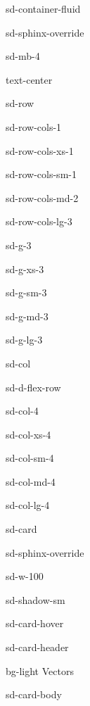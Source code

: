 \documentclass[letterpaper,10pt,english]{jupyterBook}
\let\sphinxpxdimen\pdfpxdimen\else\newdimen\sphinxpxdimen
\begin{document}
\begin{sphinxuseclass}{sd-container-fluid}
\begin{sphinxuseclass}{sd-sphinx-override}
\begin{sphinxuseclass}{sd-mb-4}
\begin{sphinxuseclass}{text-center}
\begin{sphinxuseclass}{sd-row}
\begin{sphinxuseclass}{sd-row-cols-1}
\begin{sphinxuseclass}{sd-row-cols-xs-1}
\begin{sphinxuseclass}{sd-row-cols-sm-1}
\begin{sphinxuseclass}{sd-row-cols-md-2}
\begin{sphinxuseclass}{sd-row-cols-lg-3}
\begin{sphinxuseclass}{sd-g-3}
\begin{sphinxuseclass}{sd-g-xs-3}
\begin{sphinxuseclass}{sd-g-sm-3}
\begin{sphinxuseclass}{sd-g-md-3}
\begin{sphinxuseclass}{sd-g-lg-3}
\begin{sphinxuseclass}{sd-col}
\begin{sphinxuseclass}{sd-d-flex-row}
\begin{sphinxuseclass}{sd-col-4}
\begin{sphinxuseclass}{sd-col-xs-4}
\begin{sphinxuseclass}{sd-col-sm-4}
\begin{sphinxuseclass}{sd-col-md-4}
\begin{sphinxuseclass}{sd-col-lg-4}
\begin{sphinxuseclass}{sd-card}
\begin{sphinxuseclass}{sd-sphinx-override}
\begin{sphinxuseclass}{sd-w-100}
\begin{sphinxuseclass}{sd-shadow-sm}
\begin{sphinxuseclass}{sd-card-hover}
\begin{sphinxuseclass}{sd-card-header}
\begin{sphinxuseclass}{bg-light}
\sphinxAtStartPar
Vectors

\end{sphinxuseclass}
\end{sphinxuseclass}
\begin{sphinxuseclass}{sd-card-body}
\begin{figure}[htbp]
\centering

\noindent\sphinxincludegraphics[width=250\sphinxpxdimen]{{3_dot_product}.png}
\end{figure}


\end{sphinxuseclass}
\end{sphinxuseclass}
\end{sphinxuseclass}
\end{sphinxuseclass}
\end{sphinxuseclass}
\end{sphinxuseclass}
\end{sphinxuseclass}
\end{sphinxuseclass}
\end{sphinxuseclass}
\end{sphinxuseclass}
\end{sphinxuseclass}
\end{sphinxuseclass}
\end{sphinxuseclass}
\end{sphinxuseclass}
\end{sphinxuseclass}
\end{sphinxuseclass}
\end{sphinxuseclass}
\end{sphinxuseclass}
\end{sphinxuseclass}
\end{sphinxuseclass}
\end{sphinxuseclass}
\end{sphinxuseclass}
\end{sphinxuseclass}
\end{sphinxuseclass}
\end{sphinxuseclass}
\end{sphinxuseclass}
\end{sphinxuseclass}
\end{sphinxuseclass}
\end{document}
